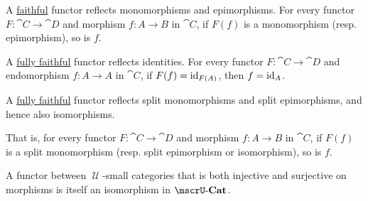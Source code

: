 \begin{proposition}
\begin{thmenum}
     A \hyperref[def:functor_invertibility/faithful]{faithful} functor reflects monomorphisms and epimorphisms. For every functor \( F: \cat{C} \to \cat{D} \) and morphism \( f: A \to B \) in \( \cat{C} \), if \( F(f) \) is a monomorphism (resp. epimorphism), so is \( f \).

     A \hyperref[def:functor_invertibility/fully_faithful]{fully faithful} functor reflects identities. For every functor \( F: \cat{C} \to \cat{D} \) and endomorphism \( f: A \to A \) in \( \cat{C} \), if \( F(f) = \operatorname{id}_{F(A)} \), then \( f = \operatorname{id}_A \).

     A \hyperref[def:functor_invertibility/fully_faithful]{fully faithful} functor reflects split monomorphisms and split epimorphisms, and hence also isomorphisms.

    That is, for every functor \( F: \cat{C} \to \cat{D} \) and morphism \( f: A \to B \) in \( \cat{C} \), if \( F(f) \) is a split monomorphism (resp. split epimorphism or isomorphism), so is \( f \).

     A functor between \( \mscrU \)-small categories that is both injective and surjective on morphisms is itself an isomorphism in \( \ucat{Cat} \).
  \end{thmenum}
\end{proposition}
